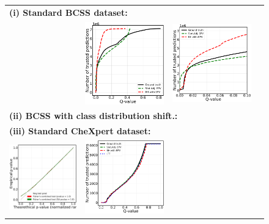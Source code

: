 \documentclass{article}
\begin{document}
\begin{figure}[h!]
	
	\begin{tabular}{cccc}
		\multicolumn{4}{l}{\bf (i) Standard BCSS dataset:}\\		
 		&\includegraphics[width=2in]{img/cnn_multi_sa_bcss_fdr_control.pdf} &
		\includegraphics[width=2in]{img/cnn_multi_sa_bcss_fdr_control_loc.pdf} & \\
		\multicolumn{4}{l}{\bf (ii) BCSS with class distribution shift.:}\\		
		\multicolumn{4}{l}{\bf (iii) Standard CheXpert dataset:}\\	
		\includegraphics[width=1.7in]{img/cnn_QQ_chx.png} 		&
		\includegraphics[width=1.7in]{img/cnn_chx_fdr_control.png} & 

\end{tabular}
\end{figure}
\end{document}
